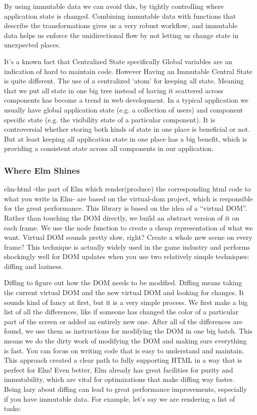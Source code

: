 \documentclass[12pt,twoside]{article}
\begin{document}
By using immutable data we can avoid this, by tightly controlling where application state is changed. Combining immutable data with functions that describe the transformations gives us a very robust workflow, and immutable data helps us enforce the unidirectional flow by not letting us change state in unexpected places.

It's a known fact that Centralized State specifically Global variables are an indication of hard to maintain code. However Having an Immutable Central State is quite different. The use of a centralized ‘atom’ for keeping all state. Meaning that we put all state in one big tree instead of having it scattered across components has become a trend in web development.
In a typical application we usually have global application state (e.g. a collection of users) and component specific state (e.g. the visibility state of a particular component). It is controversial whether storing both kinds of state in one place is beneficial or not. But at least keeping all application state in one place has a big benefit, which is providing a consistent state across all components in our application.
\subsubsection{Where Elm Shines}
elm-html -the part of Elm which render(produce) the corresponding html code to what you write in Elm- are based on the virtual-dom project, which is responsible for the great performance. 
This library is based on the idea of a “virtual DOM”. Rather than touching the DOM directly, we build an abstract version of it on each frame. We use the node function to create a cheap representation of what we want. Virtual DOM sounds pretty slow, right? Create a whole new scene on every frame? This technique is actually widely used in the game industry and performs shockingly well for DOM updates when you use two relatively simple techniques: diffing and laziness.

Diffing to figure out how the DOM needs to be modified. Diffing means taking the current virtual DOM and the new virtual DOM and looking for changes. It sounds kind of fancy at first, but it is a very simple process. We first make a big list of all the differences, like if someone has changed the color of a particular part of the screen or added an entirely new one. After all of the differences are found, we use them as instructions for modifying the DOM in one big batch. This means we do the dirty work of modifying the DOM and making sure everything is fast. You can focus on writing code that is easy to understand and maintain.
This approach created a clear path to fully supporting HTML in a way that is perfect for Elm! Even better, Elm already has great facilities for purity and immutability, which are vital for optimizations that make diffing way faster.
Being lazy about diffing can lead to great performance improvements, especially if you have immutable data. For example, let’s say we are rendering a list of tasks:
\end{document}
